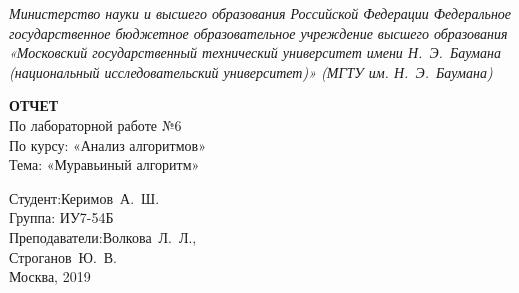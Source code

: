 \begin{titlepage}
	\centering

	{\footnotesize\itshape Министерство науки и высшего образования
	Российской Федерации Федеральное государственное бюджетное
	образовательное учреждение высшего образования «Московский
	государственный технический университет имени Н.~Э.~Баумана
	(национальный исследовательский университет)» (МГТУ им. Н.~Э.~Баумана)
	\\}

	\vspace{60mm}

	\textbf{ОТЧЕТ}\\
	По лабораторной работе №6\\
	По курсу: «Анализ алгоритмов»\\
	Тема: «Муравьиный алгоритм»\\

	\vspace{60mm}

	\hspace{70mm} Студент:\hfill Керимов~А.~Ш.\\
	\hspace{70mm} Группа: \hfill ИУ7-54Б\\
	\hspace{70mm} Преподаватели:\hfill Волкова~Л.~Л.,\\
	                            \hfill Строганов~Ю.~В.\\

	\vfill
	Москва, 2019
\end{titlepage}
